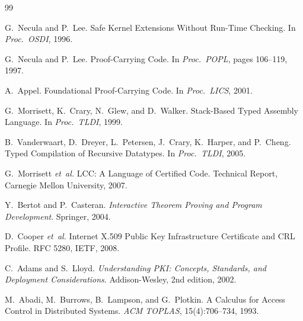 \documentclass[11pt]{article}
\begin{document}
\begin{thebibliography}{99}

G.~Necula and P.~Lee.
\newblock Safe Kernel Extensions Without Run-Time Checking.
\newblock In \textit{Proc.\ OSDI}, 1996.

G.~Necula and P.~Lee.
\newblock Proof-Carrying Code.
\newblock In \textit{Proc.\ POPL}, pages 106--119, 1997.

A.~Appel.
\newblock Foundational Proof-Carrying Code.
\newblock In \textit{Proc.\ LICS}, 2001.

G.~Morrisett, K.~Crary, N.~Glew, and D.~Walker.
\newblock Stack-Based Typed Assembly Language.
\newblock In \textit{Proc.\ TLDI}, 1999.

B.~Vanderwaart, D.~Dreyer, L.~Petersen, J.~Crary, K.~Harper, and P.~Cheng.
\newblock Typed Compilation of Recursive Datatypes.
\newblock In \textit{Proc.\ TLDI}, 2005.

G.~Morrisett \textit{et~al.}
\newblock LCC: A Language of Certified Code.
\newblock Technical Report, Carnegie Mellon University, 2007.

Y.~Bertot and P.~Casteran.
\newblock \textit{Interactive Theorem Proving and Program Development}.
\newblock Springer, 2004.

D.~Cooper \textit{et~al.}
\newblock Internet X.509 Public Key Infrastructure Certificate and CRL Profile.
\newblock RFC 5280, IETF, 2008.

C.~Adams and S.~Lloyd.
\newblock \textit{Understanding PKI: Concepts, Standards, and Deployment
  Considerations}.
\newblock Addison-Wesley, 2nd edition, 2002.

M.~Abadi, M.~Burrows, B.~Lampson, and G.~Plotkin.
\newblock A Calculus for Access Control in Distributed Systems.
\newblock \textit{ACM TOPLAS}, 15(4):706--734, 1993.

\end{thebibliography}
\end{document}
